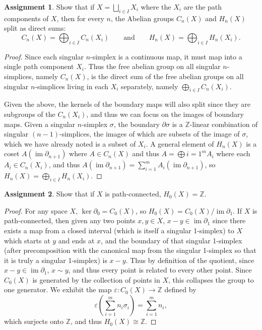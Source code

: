\documentclass[12pt]{article}
\DeclareMathOperator{\im}{im}
\theoremstyle{definition}
\newtheorem{ex}{Assignment}
\begin{document}
\begin{ex}
	Show that if $X = \bigsqcup_{i \in I} X_i$ where the $X_i$ are the path components of $X$, then for every $n$, the Abelian groups $C_n(X)$ and $H_n(X)$ split as direct sums: \begin{equation*}
		C_n(X) = \bigoplus_{i \in I} C_n(X_i) \hspace{2em}\text{and}\hspace{2em} H_n(X) = \bigoplus_{i \in I} H_n(X_i).
	\end{equation*}
\end{ex}
\begin{proof}
	Since each singular $n$-simplex is a continuous map, it must map into a single path component $X_i$.
	Thus the free abelian group on all singular $n$-simplices, namely $C_n(X)$, is the direct sum of the free abelian groups on all singular $n$-simplices living in each $X_i$ separately, namely $\bigoplus_{i \in I} C_n(X_i)$.

	Given the above, the kernels of the boundary maps will also split since they are subgroups of the $C_n(X_i)$, and thus we can focus on the images of boundary maps.
	Given a singular $n$-simplex $\sigma$, the boundary $\partial\sigma$ is a $\mathbb{Z}$-linear combination of singular $(n-1)$-simplices, the images of which are subsets of the image of $\sigma$, which we have already noted is a subset of $X_i$.
	A general element of $H_n(X)$ is a coset $A(\im \partial_{n+1})$ where $A \in C_n(X)$ and thus $A = \bigoplus{i=1}^m A_i$ where each $A_i \in C_n(X_i)$, and thus $A(\im\partial_{n+1}) = \sum_{i=1}^m A_i(\im\partial_{n+1})$, so $H_n(X) = \bigoplus_{i \in I} H_n(X_i)$.
\end{proof}

\begin{ex}
	Show that if $X$ is path-connected, $H_0(X) = \mathbb{Z}$.
\end{ex}
\begin{proof}
	For any space $X$, $\ker\partial_0 = C_0(X)$, so $H_0(X) = C_0(X)/\im\partial_1$.
	If $X$ is path-connected, then given any two points $x, y \in X$, $x - y \in \im\partial_1$ since there exists a map from a closed interval (which is itself a singular 1-simplex) to $X$ which starts at $y$ and ends at $x$, and the boundary of that singular 1-simplex (after precomposition with the canonical map from the singular 1-simplex so that it is truly a singular 1-simplex) is $x - y$.
	Thus by definition of the quotient, since $x-y \in \im\partial_1$, $x \sim y$, and thus every point is related to every other point.
	Since $C_0(X)$ is generated by the collection of points in $X$, this collapses the group to one generator.
	We exhibit the map $\varepsilon: C_0(X) \to \mathbb{Z}$ defined by \begin{equation*}
		\varepsilon\left(\sum_{i=1}^m n_i\sigma_i\right) = \sum_{i=1}^m n_i,
	\end{equation*}
	which surjects onto $\mathbb{Z}$, and thus $H_0(X) \cong \mathbb{Z}$.
\end{proof}
\end{document}
